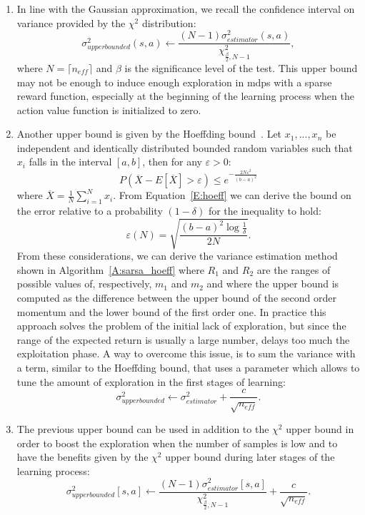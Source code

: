 \begin{enumerate}
\item  In line with the Gaussian approximation, we recall the confidence interval on variance provided by the $\chi^2$ distribution:
\begin{equation}
 \sigma^2_{upper bounded}(s,a) \gets \frac{(N - 1)\sigma^2_{estimator}(s,a)}{ \chi^2_{\frac{\beta}{2}, N - 1}},
\end{equation}
where $N = \lceil{n_{eff}}\rceil$ and $\beta$ is the significance level of the test. This upper bound may not be enough to induce enough exploration in \glspl{mdp} with a sparse reward function, especially at the beginning of the learning process when the action value function is initialized to zero.
\item Another upper bound is given by the Hoeffding bound~\cite{hoeffding1963probability}. Let $x_1, ... , x_n$ be independent and identically distributed bounded random variables such that $x_i$ falls in the interval $[a, b]$, then for any $\varepsilon > 0$:
\begin{equation}\label{E:hoeff}
 P( \overline{X} - E[\overline{X}]  > \varepsilon ) \leq e^{-\frac{2N \varepsilon^2}{(b-a)^2}} 
\end{equation}
where $\overline{X} = \frac{1}{N}\sum_{i=1}^N{x_i}$. From Equation~\ref{E:hoeff} we can derive the bound on the error relative to a probability $(1-\delta)$ for the inequality to hold:
\begin{equation}
 \varepsilon(N) = \sqrt{\frac{(b-a)^2\log{\frac{1}{\delta}}}{2N}}.
\end{equation}
From these considerations, we can derive the variance estimation method shown in Algorithm~\ref{A:sarsa_hoeff} where $R_1$ and $R_2$ are the ranges of possible values of, respectively, $m_1$ and $m_2$ and where the upper bound is computed as the difference between the upper bound of the second order momentum and the lower bound of the first order one. In practice this approach solves the problem of the initial lack of exploration, but since the range of the expected return is usually a large number, delays too much the exploitation phase. A way to overcome this issue, is to sum the variance with a term, similar to the Hoeffding bound, that uses a parameter which allows to tune the amount of exploration in the first stages of learning:
\begin{equation}
 \sigma^2_{upper bounded} \gets \sigma^2_{estimator} + \frac{c}{\sqrt{n_{eff}}}.
\end{equation}
\item The previous upper bound can be used in addition to the $\chi^2$ upper bound in order to boost the exploration when the number of samples is low and to have the benefits given by the $\chi^2$ upper bound during later stages of the learning process:
\begin{equation}
 \sigma^2_{upper bounded}[s,a] \gets \frac{(N - 1)\sigma^2_{estimator}[s,a]}{ \chi^2_{\frac{\beta}{2}, N - 1}} + \frac{c}{\sqrt{n_{eff}}}.
\end{equation}
\end{enumerate}
